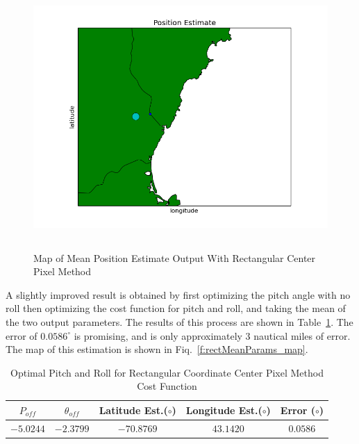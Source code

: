 \documentclass[12pt,a4paper]{book}
\begin{document}
\begin{figure}[!ht]
\centering
\includegraphics[height=10cm]{rectMeanEst_map.png}
\caption{Map of Mean Position Estimate Output With Rectangular Center Pixel Method}\label{f:rectMeanEst_map}
\end{figure}



A slightly improved result is obtained by first optimizing the pitch angle with no roll then optimizing the cost function for pitch and roll, and taking the mean of the two output parameters.  The results of this process are shown in Table~\ref{t:rectMeanParams}.  The error of $0.0586^{\circ}$ is promising, and is only approximately 3 nautical miles of error.  The map of this estimation is shown in Fiq.~\ref{f:rectMeanParams_map}.  
\begin{table}[ht!]
\centering
\begin{tabular}{ |c|c|c|c|c| } 
 \hline
 $P_{off}$ & $\theta_{off}$ & Latitude Est.($\circ$) & Longitude Est.($\circ$)&Error ($\circ$) \\ 
 \hline
 $-5.0244$ & $-2.3799$ & $-70.8769$ & $43.1420$ &$0.0586$   \\ 
 \hline
\end{tabular}
\caption{Optimal Pitch and Roll for Rectangular Coordinate Center Pixel Method Cost Function}
\label{t:rectMeanParams}
\end{table}
\end{document}
